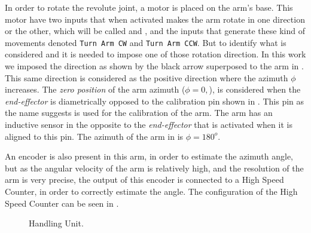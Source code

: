 In order to rotate the revolute joint, a motor is placed
on the arm's base. This motor have two inputs that when activated makes the arm
rotate in one direction or the other, which will be called \CW{} and \CCW, and
the inputs that generate these kind of movements denoted
\verb|Turn Arm CW| and \verb|Turn Arm CCW|. But to identify what is considered
\CW{} and \CCW{} it is needed to impose one of those rotation direction. In this
work we imposed the \CCW{} direction as shown by the black arrow superposed to
the arm in . This same direction is considered as the
positive direction where the azimuth $\phi$ increases. The
\emph{zero position} of the arm azimuth ($\phi=0,$), is considered when the
\emph{end-effector} is diametrically opposed to the calibration pin shown in
. This pin as the name suggests is used for the
calibration of the arm. The arm has an inductive sensor in the opposite to the
\emph{end-effector} that is activated when
it is aligned to this pin.  The azimuth of the arm in  is
$\phi=180^o$.

An encoder is also present in this arm, in order to estimate the
azimuth angle, but as the angular velocity of the arm is relatively high, and
the resolution of the arm is very precise, the output of this encoder is connected to a High Speed
Counter, in order to correctly estimate the angle. The configuration
of the High Speed Counter can be seen in \cite{rochapereira2019automacao,antunesfloriano2019sincronizacao}.
\begin{figure}[H]
  \centering
  \caption{Handling Unit.}
  \label{fig:handlingUnit}
\end{figure}


